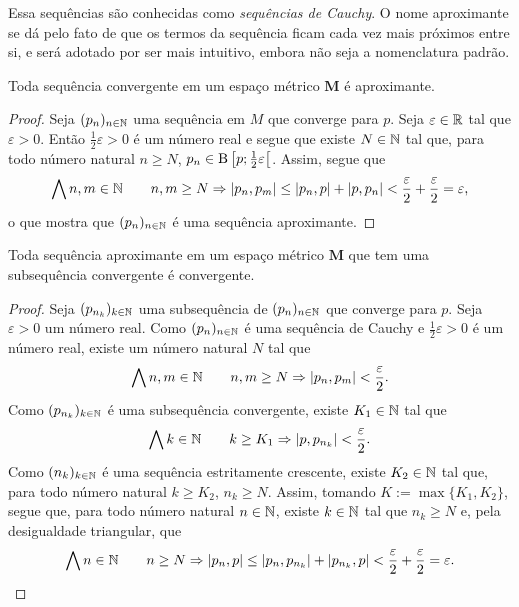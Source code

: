 Essa sequências são conhecidas como \emph{sequências de Cauchy}. O nome aproximante se dá pelo fato de que os termos da sequência ficam cada vez mais próximos entre si, e será adotado por ser mais intuitivo, embora não seja a nomenclatura padrão.

\begin{proposition}
Toda sequência convergente em um espaço métrico $\bm M$ é aproximante.
\end{proposition}
\begin{proof}
Seja $(p_n)_{n \in \mathbb{N}}$ uma sequência em $M$ que converge para $p$. Seja $\varepsilon \in \mathbb{R}$ tal que $\varepsilon > 0$. Então $\frac{1}{2}\varepsilon > 0$ é um número real e segue que existe $N \in \mathbb{N}$ tal que, para todo número natural $n \geq N$, $p_n \in \mathrm{B}\left[{p};{\frac{1}{2}\varepsilon}\right[$. Assim, segue que	
	\begin{equation*}
	\bigwedge\nolimits n,m \in \mathbb{N} \qquad n,m \geq N \Rightarrow \left\vert{p_n},{p_m}\right\vert \leq \left\vert{p_n},{p}\right\vert + \left\vert{p},{p_n}\right\vert < \frac{\varepsilon}{2} + \frac{\varepsilon}{2} = \varepsilon,
	\end{equation*}
o que mostra que $(p_n)_{n \in \mathbb{N}}$ é uma sequência aproximante.
\end{proof}

\begin{proposition}
Toda sequência aproximante em um espaço métrico $\bm M$ que tem uma subsequência convergente é convergente.
\end{proposition}
\begin{proof}
	Seja $(p_{n_k})_{k \in \mathbb{N}}$ uma subsequência de $(p_n)_{n \in \mathbb{N}}$ que converge  para $p$. Seja $\varepsilon > 0$ um número real. Como $(p_n)_{n \in \mathbb{N}}$ é uma sequência de Cauchy e $\frac{1}{2}\varepsilon > 0$ é um número real, existe um número natural $N$ tal que
	\begin{equation*}
	\bigwedge\nolimits n,m \in \mathbb{N} \qquad n,m \geq N \Rightarrow \left\vert{p_n},{p_m}\right\vert < \frac{\varepsilon}{2}.
	\end{equation*}
Como $(p_{n_k})_{k \in \mathbb{N}}$ é uma subsequência convergente, existe $K_1 \in \mathbb{N}$ tal que
	\begin{equation*}
	\bigwedge\nolimits k \in \mathbb{N} \qquad k \geq K_1 \Rightarrow \left\vert{p},{p_{n_k}}\right\vert < \frac{\varepsilon}{2}.
	\end{equation*}
Como $(n_k)_{k \in \mathbb{N}}$ é uma sequência estritamente crescente, existe $K_2 \in \mathbb{N}$ tal que, para todo número natural $k \geq K_2$, $n_k \geq N$. Assim, tomando $K := \max\{K_1,K_2\}$, segue que, para todo número natural $n \in \mathbb{N}$, existe $k \in \mathbb{N}$ tal que $n_k \geq N$ e,  pela desigualdade triangular, que
	\begin{equation*}
	\bigwedge\nolimits n \in \mathbb{N} \qquad n \geq N \Rightarrow \left\vert{p_n},{p}\right\vert \leq \left\vert{p_n},{p_{n_k}}\right\vert + \left\vert{p_{n_k}},{p}\right\vert < \frac{\varepsilon}{2}+\frac{\varepsilon}{2}=\varepsilon.
	\end{equation*}
\end{proof}

